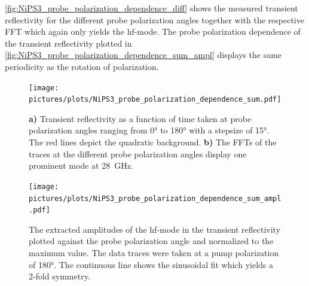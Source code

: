 \FloatBarrier
\autoref{fig:NiPS3_probe_polarization_dependence_diff} shows the measured transient reflectivity for the different probe polarization angles together with the respective FFT which again only yields the hf-mode.
The probe polarization dependence of the transient reflectivity plotted in \autoref{fig:NiPS3_probe_polarization_dependence_sum_ampl} displays the same periodicity as the rotation of polarization.
\begin{figure}[hbt!]
    \centering
    \texttt{[image: pictures/plots/NiPS3\_probe\_polarization\_dependence\_sum.pdf]} \vspace{-0.3cm}
    \caption{\textbf{a)} Transient reflectivity as a function of time taken at probe polarization angles ranging from 0° to 180° with a stepsize of 15°. The red lines depict the quadratic background. \textbf{b)} The FFTs of the traces at the different probe polarization angles display one prominent mode at \qty{28}{GHz}.}
    \label{fig:NiPS3_probe_polarization_dependence_sum}
\end{figure}
\begin{figure}[hbt!]
    \centering  
    \texttt{[image: pictures/plots/NiPS3\_probe\_polarization\_dependence\_sum\_ampl.pdf]} \vspace{-0.3cm}
    \caption{The extracted amplitudes of the hf-mode in the transient reflectivity plotted against the probe polarization angle and normalized to the maximum value. The data traces were taken at a pump polarization of 180°. The continuous line shows the sinusoidal fit which yields a 2-fold symmetry.}
    \label{fig:NiPS3_probe_polarization_dependence_sum_ampl}
\end{figure}
\FloatBarrier

